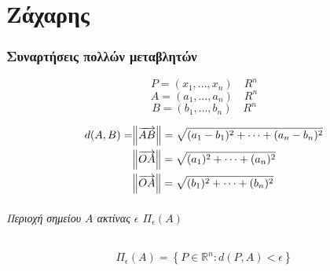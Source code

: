 \documentclass[11pt,a4paper,titlepage,draft]{article}
\begin{document}
\newpage

\part{Ζάχαρης}

\section{Συναρτήσεις πολλών μεταβλητών}

\[P = (x_1,\dots,x_n)  \mathbb \quad R ^n\]
\[A = (a_1,\dots,a_n)  \mathbb \quad R ^n\]
\[B = (b_1,\dots,b_n)  \mathbb \quad R ^n\]

\begin{align*}
d(A,B) = &\norm{\overrightarrow{AB}} = \sqrt{(a_1-b_1)^2 + \dots + (a_n-b_n)^2} \\
&\norm{\overrightarrow{OA}} = \sqrt{(a_1)^2 + \dots + (a_n)^2} \\
&\norm{\overrightarrow{OA}} = \sqrt{(b_1)^2 + \dots + (b_n)^2}
\end{align*}

\paragraph{Περιοχή σημείου \(Α\) ακτίνας \(\epsilon\) \(\Pi_\epsilon(A)\)}

\begin{wrapfigure}{r}{0.25\textwidth}
\end{wrapfigure}
\[
\Pi_\epsilon(A) = \left\lbrace P \in  \mathbb R ^n : d(P,A) < \epsilon \right\rbrace
\]
\end{document}
